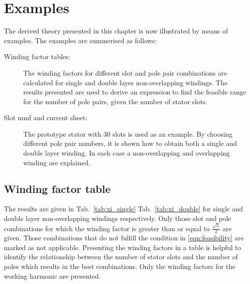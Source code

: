 \section{Examples}
The derived theory presented in this chapter is now illustrated by means of examples. The examples are summerised as follows:
\begin{description}
	\item[Winding factor tables:] The winding factors for different slot and pole pair combinations are calculated for single and double layer non-overlapping windings. The results presented are used to derive an expression to find the feasible range for the number of pole pairs, given the number of stator slots. 
	\item[Slot mmf and current sheet:] The prototype stator with 30 slots is used as an example. By choosing different pole pair numbers, it is shown how to obtain both a single and double layer winding. In each case a non-overlapping and overlapping winding are explained.
\end{description}
  
\subsection{Winding factor table}\label{subsec:wind_fac_table}
The results are given in Tab.~\ref{tab:xi_single} Tab.~\ref{tab:xi_double} for single and double layer non-overlapping windings respectively. Only those slot and pole combinations for which the winding factor is greater than or equal to $\frac{\sqrt{3}}{2}$ are given. Those combinations that do not fulfill the condition in \eqref{eqn:feasibility} are marked as not applicable. Presenting the winding factors in a table is helpful to identify the relationship between the number of stator slots and the number of poles which results in the best combinations. Only the winding factors for the working harmonic are presented. 

